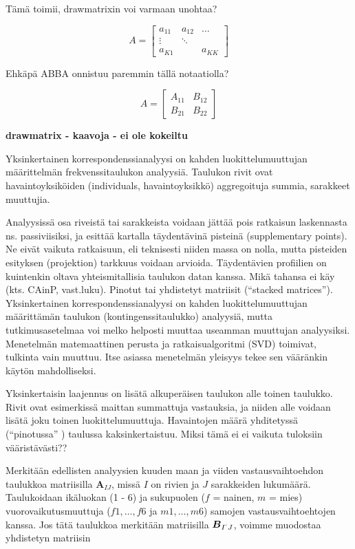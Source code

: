 \documentclass[finnish,]{article}
\begin{document}
Tämä toimii, drawmatrixin voi varmaan unohtaa?

\begin{equation}
A = \begin{bmatrix} 
    a_{11} & a_{12} & \dots \\
    \vdots & \ddots & \\
    a_{K1} &        & a_{KK} 
    \end{bmatrix}
\end{equation}

Ehkäpä ABBA onnistuu paremmin tällä notaatiolla?

\begin{equation}
A = \begin{bmatrix} 
    A_{11} & B_{12}  \\
    B_{21} & B_{22} 
    \end{bmatrix}
\end{equation}

\textbf{drawmatrix - kaavoja - ei ole kokeiltu}

Yksinkertainen korrespondenssianalyysi on kahden luokittelumuuttujan
määrittelmän frekvenssitaulukon analyysiä. Taulukon rivit ovat
havaintoyksiköiden (individuals, havaintoyksikkö) aggregoituja summia,
sarakkeet muuttujia.

Analyysissä osa riveistä tai sarakkeista voidaan jättää pois ratkaisun
laskennasta ns. passiviisiksi, ja esittää kartalla täydentävinä pisteinä
(supplementary points). Ne eivät vaikuta ratkaisuun, eli teknisesti
niiden massa on nolla, mutta pisteiden esityksen (projektion) tarkkuus
voidaan arvioida. Täydentävien profiilien on kuintenkin oltava
yhteismitallisia taulukon datan kanssa. Mikä tahansa ei käy (kts. CAinP,
vast.luku). Pinotut tai yhdistetyt matriisit (``stacked matrices'').
Yksinkertainen korrespondenssianalyysi on kahden luokittelumuuttujan
määrittämän taulukon (kontingenssitaulukko) analyysiä, mutta
tutkimusasetelmaa voi melko helposti muuttaa useamman muuttujan
analyysiksi. Menetelmän matemaattinen perusta ja ratkaisualgoritmi (SVD)
toimivat, tulkinta vain muuttuu. Itse asiassa menetelmän yleisyys tekee
sen vääränkin käytön mahdolliseksi.

Yksinkertaisin laajennus on lisätä alkuperäisen taulukon alle toinen
taulukko. Rivit ovat esimerkissä maittan summattuja vastauksia, ja
niiden alle voidaan lisätä joku toinen luokittelumuuttuja. Havaintojen
määrä yhditetyssä (``pinotussa'' ) taulussa kaksinkertaistuu. Miksi tämä
ei ei vaikuta tuloksiin vääristävästi??

Merkitään edellisten analyysien kuuden maan ja viiden vastausvaihtoehdon
taulukkoa matriisilla \(\boldsymbol{ A}_{I J}\), missä \(I\) on rivien
ja \(J\) sarakkeiden lukumäärä. Taulukoidaan ikäluokan (1 - 6) ja
sukupuolen (\(f\) = nainen, \(m\) = mies) vuorovaikutusmuuttuja
(\(f1,\dots , f6\) ja \(m1,\dots , m6\)) samojen vastausvaihtoehtojen
kanssa. Jos tätä taulukkoa merkitään matriisilla
\(\boldsymbol{ B}_{I^{`} J}\), voimme muodostaa yhdistetyn matriisin
\end{document}
